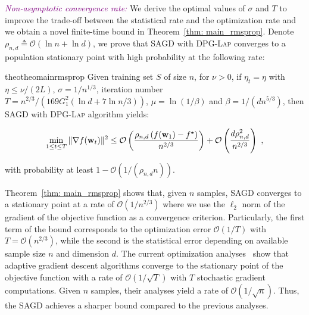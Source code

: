 \documentclass[11pt]{article}
\begin{document}
\textcolor{purple}{\textit{Non-asymptotic convergence rate:}}
We derive the optimal values of $\sigma$ and $T$ to improve the trade-off between the statistical rate and the optimization rate and we obtain a novel finite-time bound in Theorem~\ref{thm: main_rmsprop}. 
Denote $\rho_{n,d} \triangleq\mathcal{O} \left(\ln n + \ln d\right)$, we prove that \textsc{SAGD} with \textsc{DPG-Lap} converges to a population stationary point with high probability at the following rate:

\begin{restatable}{theo}{theomainrmsprop}
\label{thm: main_rmsprop}
 Given training set $S$ of size $n$, for $\nu >0$, if $\eta_t = \eta$  with $\eta \leq \nu/(2L)$,  $\sigma = 1/n^{1/3}$, iteration number $T = n^{2/3}/\left(169G_1^2(\ln d +7\ln n/3)\right)$, $\mu = \ln (1/\beta)$ and $\beta = 1/(d n^{5/3})$, then \textsc{SAGD} with \textsc{DPG-Lap} algorithm yields:
 \begin{small}
\begin{equation*}
 \min_{1\leq t \leq T}\|\nabla f(\mathbf{w}_t)\|^2 \leq
\mathcal{O} \left( \frac{\rho_{n,d} \left(f(\mathbf{w}_1) - f^\star \right)}{n^{2/3}} \right) + \mathcal{O} \left( \frac{d \rho_{n,d}^2}{n^{2/3}}\right)~,
\end{equation*}
\end{small}
with probability at least $1-\mathcal{O} \left(1/(\rho_{n,d} n)\right)$.
\end{restatable} 
Theorem~\ref{thm: main_rmsprop} shows that, given $n$ samples, \textsc{SAGD} converges to a stationary point at a rate of $\mathcal{O}(1/n^{2/3})$ where we use the $\ell_2$ norm of the gradient of the objective function as a convergence criterion.
Particularly, the first term of the bound corresponds to the optimization error $\mathcal{O}(1/T)$ with $T = \mathcal{O}(n^{2/3})$, while the second is the statistical error depending on available sample size $n$ and dimension $d$. 
The current optimization analyses~\citep{zare18, wawu19, zosh2019, cheli2019} show that adaptive gradient descent algorithms converge to the stationary point of the objective function with a rate of $\mathcal{O}(1/\sqrt{T})$ with $T$ stochastic gradient computations. 
Given $n$ samples, their analyses yield a rate of  $\mathcal{O}(1/\sqrt{n})$. 
Thus, the \textsc{SAGD} achieves a sharper bound compared to the previous analyses.  

\vspace{-0.05in}
\end{document}
